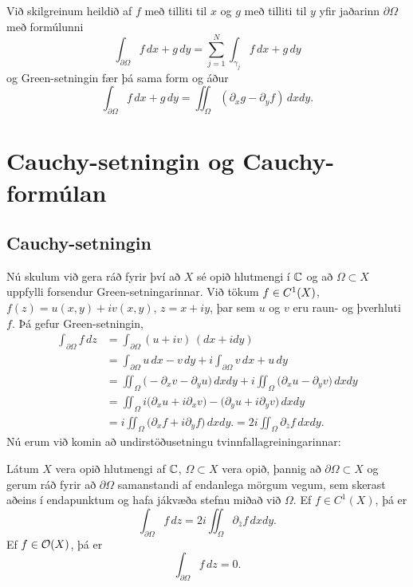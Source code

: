 
\noindent
Við skilgreinum heildið  af $f$  með
tilliti til $x$ og $g$ með tilliti til $y$ yfir jaðarinn
$\partial\Omega$ með formúlunni
 $$\int_{\partial\Omega}f\, dx + g\, dy =\sum_{j=1}^N \int_{\gamma_j}f
\, dx + g\, dy
 $$
og Green-setningin fær þá sama form og áður
 $$\int_{\partial\Omega}f\, dx+g\, dy =\iint_\Omega
(\partial_xg-\partial_yf)\, dxdy.
 $$


 
\section {Cauchy-setningin og Cauchy-formúlan}

\subsection*{Cauchy-setningin}

Nú skulum við gera ráð fyrir því að $X$ sé opið hlutmengi í ${\mathbb C}$ og
að $\Omega\subset X$ uppfylli forsendur Green-setningarinnar.  Við
tökum $f\in C\sp 1(X)$, $f(z)=u(x,y)+iv(x,y)$, $z=x+iy$, þar sem $u$ og
$v$ eru raun-  og  þverhluti $f$.
Þá gefur Green-setningin,
\begin{align*}
\int_{\partial\Omega} f\, dz 
&=\int_{\partial\Omega} (u+iv)\, (dx+idy)\label{10.2.1}\\
&=\int_{\partial\Omega} u\, dx - v\, dy
+i\int_{\partial\Omega} v\, dx + u\, dy\nonumber\\
&=\iint_{\Omega}\big(-\partial_x v-\partial_y u\big) \, dxdy
+i\iint_{\Omega}\big(\partial_x u-\partial_y v\big) \, dxdy\nonumber\\
&=\iint_{\Omega}i\big(\partial_x u+i\partial_x v\big)-
\big(\partial_y u+i\partial_y v \big) \, dxdy \nonumber\\
&=i\iint_{\Omega}\big(\partial_x f+i\partial_y f\big) \, dxdy.
=2i\iint_{\Omega}\partial_{\bar z} f \, dxdy.\nonumber
\end{align*}
Nú erum við komin að undirstöðusetningu tvinnfallagreiningarinnar:

\begin{se}
Látum $X$ vera opið hlutmengi af ${\mathbb C}$, $\Omega\subset X$ vera opið,
þannig að $\partial\Omega\subset X$ og gerum ráð fyrir að
$\partial\Omega$ samanstandi af endanlega mörgum vegum, sem skerast
aðeins í endapunktum og hafa jákvæða stefnu miðað við ${\Omega}$.
Ef $f\in C^1(X)$, þá er
\begin{equation*}\int_{\partial\Omega}f\, dz = 
2i\iint_{\Omega}\partial_{\bar z} f \, dxdy.
\label{10.2.2}
\end{equation*}
Ef $f\in {\cal O}(X)$, þá er
\begin{equation*}
\int_{\partial\Omega}f\, dz = 0.
\label{10.2.3}
\end{equation*}
\end{se}



